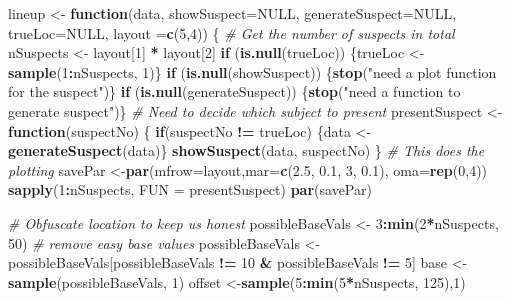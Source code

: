 \documentclass[9pt,letter]{article}
\newenvironment{Shaded}{\begin{snugshade}}{\end{snugshade}}
\newcommand{\KeywordTok}[1]{\textcolor[rgb]{0.13,0.29,0.53}{\textbf{#1}}}
\newcommand{\DataTypeTok}[1]{\textcolor[rgb]{0.13,0.29,0.53}{#1}}
\newcommand{\DecValTok}[1]{\textcolor[rgb]{0.00,0.00,0.81}{#1}}
\newcommand{\FloatTok}[1]{\textcolor[rgb]{0.00,0.00,0.81}{#1}}
\newcommand{\StringTok}[1]{\textcolor[rgb]{0.31,0.60,0.02}{#1}}
\newcommand{\CommentTok}[1]{\textcolor[rgb]{0.56,0.35,0.01}{\textit{#1}}}
\newcommand{\OtherTok}[1]{\textcolor[rgb]{0.56,0.35,0.01}{#1}}
\newcommand{\ControlFlowTok}[1]{\textcolor[rgb]{0.13,0.29,0.53}{\textbf{#1}}}
\newcommand{\OperatorTok}[1]{\textcolor[rgb]{0.81,0.36,0.00}{\textbf{#1}}}
\newcommand{\NormalTok}[1]{#1}
\begin{document}
\begin{Shaded}
\begin{Highlighting}[]
\NormalTok{lineup <-}\StringTok{ }\ControlFlowTok{function}\NormalTok{(data, }\DataTypeTok{showSuspect=}\OtherTok{NULL}\NormalTok{, }\DataTypeTok{generateSuspect=}\OtherTok{NULL}\NormalTok{,}
                   \DataTypeTok{trueLoc=}\OtherTok{NULL}\NormalTok{, }\DataTypeTok{layout =}\KeywordTok{c}\NormalTok{(}\DecValTok{5}\NormalTok{,}\DecValTok{4}\NormalTok{)) \{}
  \CommentTok{# Get the number of suspects in total}
\NormalTok{  nSuspects <-}\StringTok{ }\NormalTok{layout[}\DecValTok{1}\NormalTok{] }\OperatorTok{*}\StringTok{ }\NormalTok{layout[}\DecValTok{2}\NormalTok{]}
  \ControlFlowTok{if}\NormalTok{ (}\KeywordTok{is.null}\NormalTok{(trueLoc)) \{trueLoc <-}\KeywordTok{sample}\NormalTok{(}\DecValTok{1}\OperatorTok{:}\NormalTok{nSuspects, }\DecValTok{1}\NormalTok{)\}}
  \ControlFlowTok{if}\NormalTok{ (}\KeywordTok{is.null}\NormalTok{(showSuspect)) \{}\KeywordTok{stop}\NormalTok{(}\StringTok{"need a plot function for the suspect"}\NormalTok{)\}}
  \ControlFlowTok{if}\NormalTok{ (}\KeywordTok{is.null}\NormalTok{(generateSuspect)) \{}\KeywordTok{stop}\NormalTok{(}\StringTok{"need a function to generate suspect"}\NormalTok{)\}}
  \CommentTok{# Need to decide which subject to present}
\NormalTok{  presentSuspect <-}\StringTok{ }\ControlFlowTok{function}\NormalTok{(suspectNo) \{}
    \ControlFlowTok{if}\NormalTok{(suspectNo }\OperatorTok{!=}\StringTok{ }\NormalTok{trueLoc) \{data <-}\KeywordTok{generateSuspect}\NormalTok{(data)\}}
    \KeywordTok{showSuspect}\NormalTok{(data, suspectNo) }
\NormalTok{  \}}
  \CommentTok{# This does the plotting}
\NormalTok{  savePar <-}\KeywordTok{par}\NormalTok{(}\DataTypeTok{mfrow=}\NormalTok{layout,}\DataTypeTok{mar=}\KeywordTok{c}\NormalTok{(}\FloatTok{2.5}\NormalTok{, }\FloatTok{0.1}\NormalTok{, }\DecValTok{3}\NormalTok{, }\FloatTok{0.1}\NormalTok{), }\DataTypeTok{oma=}\KeywordTok{rep}\NormalTok{(}\DecValTok{0}\NormalTok{,}\DecValTok{4}\NormalTok{))}
  \KeywordTok{sapply}\NormalTok{(}\DecValTok{1}\OperatorTok{:}\NormalTok{nSuspects, }\DataTypeTok{FUN =}\NormalTok{ presentSuspect)}
  \KeywordTok{par}\NormalTok{(savePar)}
  
  \CommentTok{# Obfuscate location to keep us honest}
\NormalTok{  possibleBaseVals <-}\StringTok{ }\DecValTok{3}\OperatorTok{:}\KeywordTok{min}\NormalTok{(}\DecValTok{2}\OperatorTok{*}\NormalTok{nSuspects, }\DecValTok{50}\NormalTok{) }\CommentTok{# remove easy base values}
\NormalTok{  possibleBaseVals <-}\StringTok{ }\NormalTok{possibleBaseVals[possibleBaseVals }\OperatorTok{!=}\StringTok{ }\DecValTok{10} \OperatorTok{&}\StringTok{ }\NormalTok{possibleBaseVals }\OperatorTok{!=}\StringTok{ }\DecValTok{5}\NormalTok{]}
\NormalTok{  base <-}\KeywordTok{sample}\NormalTok{(possibleBaseVals, }\DecValTok{1}\NormalTok{)}
\NormalTok{  offset <-}\KeywordTok{sample}\NormalTok{(}\DecValTok{5}\OperatorTok{:}\KeywordTok{min}\NormalTok{(}\DecValTok{5}\OperatorTok{*}\NormalTok{nSuspects, }\DecValTok{125}\NormalTok{),}\DecValTok{1}\NormalTok{)}
  

\end{Highlighting}
\end{Shaded}
\end{document}
